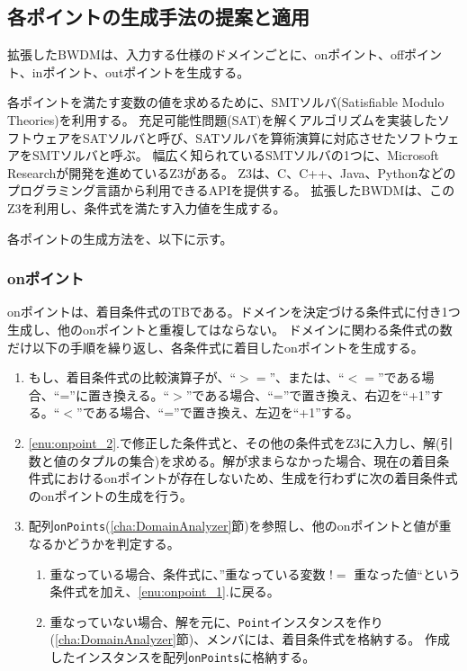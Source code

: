 \documentclass[uplatex, report, a4j, 10pt]{jsbook}
\newcommand\ttt[1]{\texttt{#1}}
\begin{document}
\subsection{各ポイントの生成手法の提案と適用}\label{cha:create_point}
拡張したBWDMは、入力する仕様のドメインごとに、onポイント、offポイント、inポイント、outポイントを生成する。

各ポイントを満たす変数の値を求めるために、SMTソルバ(Satisfiable Modulo Theories)\cite{sat}を利用する。
充足可能性問題(SAT)を解くアルゴリズムを実装したソフトウェアをSATソルバと呼び、SATソルバを算術演算に対応させたソフトウェアをSMTソルバと呼ぶ。
幅広く知られているSMTソルバの1つに、Microsoft Researchが開発を進めているZ3\cite{z3}がある。
Z3は、C、C++、Java、Pythonなどのプログラミング言語から利用できるAPIを提供する。
拡張したBWDMは、このZ3を利用し、条件式を満たす入力値を生成する。

各ポイントの生成方法を、以下に示す。

\subsubsection{onポイント}
onポイントは、着目条件式のTBである。ドメインを決定づける条件式に付き1つ生成し、他のonポイントと重複してはならない。
ドメインに関わる条件式の数だけ以下の手順を繰り返し、各条件式に着目したonポイントを生成する。
\begin{enumerate}
  \item\label{enu:onpoint_2} もし、着目条件式の比較演算子が、“$>=$”、または、“$<=$”である場合、“=”に置き換える。“$>$”である場合、“=”で置き換え、右辺を“+1”する。“$<$”である場合、“=”で置き換え、左辺を“+1”する。
  \item\label{enu:onpoint_1} \ref{enu:onpoint_2}.で修正した条件式と、その他の条件式をZ3に入力し、解(引数と値のタプルの集合)を求める。解が求まらなかった場合、現在の着目条件式におけるonポイントが存在しないため、生成を行わずに次の着目条件式のonポイントの生成を行う。
  \item 配列\ttt{onPoints}(\ref{cha:DomainAnalyzer}節)を参照し、他のonポイントと値が重なるかどうかを判定する。
        \begin{enumerate}
          \item 重なっている場合、条件式に、”重なっている変数 $!=$ 重なった値“という条件式を加え、\ref{enu:onpoint_1}.に戻る。
          \item 重なっていない場合、解を元に、\ttt{Point}インスタンスを作り(\ref{cha:DomainAnalyzer}節)、メンバ\forcusedConditionalExpression{}には、着目条件式を格納する。
                作成したインスタンスを配列\ttt{onPoints}に格納する。
        \end{enumerate}
\end{enumerate}
\end{document}

